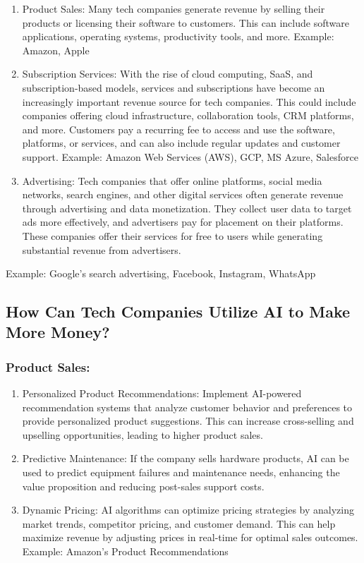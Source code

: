 \documentclass[
]{article}
\begin{document}
\begin{enumerate}
\def\labelenumi{\arabic{enumi}.}
\item
  Product Sales: Many tech companies generate revenue by selling their products or licensing their software to customers. This can include software applications, operating systems, productivity tools, and more.
  Example: Amazon, Apple
\item
  Subscription Services: With the rise of cloud computing, SaaS, and subscription-based models, services and subscriptions have become an increasingly important revenue source for tech companies. This could include companies offering cloud infrastructure, collaboration tools, CRM platforms, and more. Customers pay a recurring fee to access and use the software, platforms, or services, and can also include regular updates and customer support.
  Example: Amazon Web Services (AWS), GCP, MS Azure, Salesforce
\item
  Advertising: Tech companies that offer online platforms, social media networks, search engines, and other digital services often generate revenue through advertising and data monetization. They collect user data to target ads more effectively, and advertisers pay for placement on their platforms. These companies offer their services for free to users while generating substantial revenue from advertisers.
\end{enumerate}

Example: Google's search advertising, Facebook, Instagram, WhatsApp

\hypertarget{how-can-tech-companies-utilize-ai-to-make-more-money}{%
\subsection{How Can Tech Companies Utilize AI to Make More Money?}\label{how-can-tech-companies-utilize-ai-to-make-more-money}}

\hypertarget{product-sales}{%
\subsubsection{Product Sales:}\label{product-sales}}

\begin{enumerate}
\def\labelenumi{\arabic{enumi}.}
\item
  Personalized Product Recommendations: Implement AI-powered recommendation systems that analyze customer behavior and preferences to provide personalized product suggestions. This can increase cross-selling and upselling opportunities, leading to higher product sales.
\item
  Predictive Maintenance: If the company sells hardware products, AI can be used to predict equipment failures and maintenance needs, enhancing the value proposition and reducing post-sales support costs.
\item
  Dynamic Pricing: AI algorithms can optimize pricing strategies by analyzing market trends, competitor pricing, and customer demand. This can help maximize revenue by adjusting prices in real-time for optimal sales outcomes.
  Example: Amazon's Product Recommendations
\end{enumerate}
\end{document}
